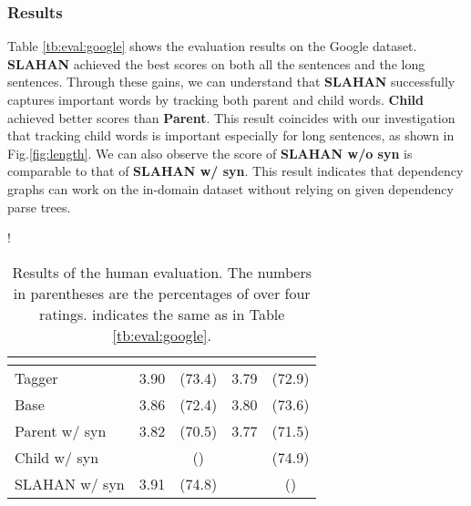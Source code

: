 \documentclass[letterpaper]{article} \usepackage{aaai20}  \usepackage{times}  \usepackage{helvet} \usepackage{courier}  \usepackage[hyphens]{url}  \usepackage{graphicx} \urlstyle{rm} \def\UrlFont{\rm}  \usepackage{graphicx}  \frenchspacing  \setlength{\pdfpagewidth}{8.5in}  \setlength{\pdfpageheight}{11in}  \usepackage{tabu}
\begin{document}
\subsubsection{Results}

Table \ref{tb:eval:google} shows the evaluation results on the Google dataset. 
\textbf{SLAHAN} achieved the best scores on both all the sentences and the long sentences. Through these gains, we can understand that \textbf{SLAHAN} successfully captures important words by tracking both parent and child words.
\textbf{Child} achieved better scores than \textbf{Parent}. This result coincides with our investigation that tracking child words is important especially for long sentences, as shown in Fig.\ref{fig:length}. 
We can also observe the score of \textbf{SLAHAN w/o syn} is comparable to that of \textbf{SLAHAN w/ syn}.
This result indicates that dependency graphs can work on the in-domain dataset without relying on given dependency parse trees.
\begin{table}[!t]
\centering
\small
\resizebox {0.6\columnwidth} {!} {
\begin{tabular}{lcccc}
\toprule
& \multicolumn{2}{c}{} & \multicolumn{2}{c}{} \\
\midrule
Tagger       & 3.90 & \hspace{-3mm}(73.4) & \hspace{-1mm}3.79 & \hspace{-3mm}(72.9) \\
Base        & 3.86 & \hspace{-3mm}(72.4) & \hspace{-1mm}3.80 & \hspace{-3mm}(73.6) \\
Parent w/ syn & 3.82 & \hspace{-3mm}(70.5) & \hspace{-1mm}3.77 & \hspace{-3mm}(71.5) \\
\midrule
Child w/ syn &  & \hspace{-3mm}() & \hspace{-1mm} & \hspace{-3mm}(74.9) \\
SLAHAN w/ syn & 3.91 & \hspace{-3mm}(74.8) & \hspace{-1mm} & \hspace{-3mm}() \\
\bottomrule
\end{tabular}
}
    \caption{Results of the human evaluation.
    The numbers in parentheses are the percentages of over four ratings.  indicates the same as in Table \ref{tb:eval:google}. \label{tb:eval:human}}
\end{table}
\end{document}
